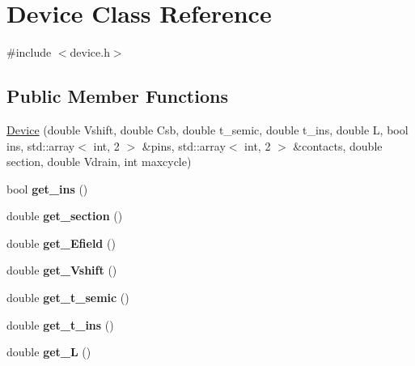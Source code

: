 \hypertarget{classDevice}{\section{Device Class Reference}
\label{classDevice}
}


{\ttfamily \#include $<$device.\-h$>$}

\subsection*{Public Member Functions}
\begin{DoxyCompactItemize}
\item 
\hyperlink{classDevice_a7c9bc563a5b6aaeddd44dab80d3c8121}{Device} (double Vshift, double Csb, double t\-\_\-semic, double t\-\_\-ins, double L, bool ins, std\-::array$<$ int, 2 $>$ \&pins, std\-::array$<$ int, 2 $>$ \&contacts, double section, double Vdrain, int maxcycle)
\item 
\hypertarget{classDevice_ab90a7fb2c749ccf25033da330590c2de}{bool {\bfseries get\-\_\-ins} ()}\label{classDevice_ab90a7fb2c749ccf25033da330590c2de}

\item 
\hypertarget{classDevice_a1c84a935099b1fa38983f7cfc9fa3fe8}{double {\bfseries get\-\_\-section} ()}\label{classDevice_a1c84a935099b1fa38983f7cfc9fa3fe8}

\item 
\hypertarget{classDevice_a2fabd548729fe1f66bc6578426b47732}{double {\bfseries get\-\_\-\-Efield} ()}\label{classDevice_a2fabd548729fe1f66bc6578426b47732}

\item 
\hypertarget{classDevice_a0e44635364c35d29b7bd1d04ae1b6e5b}{double {\bfseries get\-\_\-\-Vshift} ()}\label{classDevice_a0e44635364c35d29b7bd1d04ae1b6e5b}

\item 
\hypertarget{classDevice_a6160be09fdf4f0e97b4bddf6f862fc7d}{double {\bfseries get\-\_\-t\-\_\-semic} ()}\label{classDevice_a6160be09fdf4f0e97b4bddf6f862fc7d}

\item 
\hypertarget{classDevice_a3ee9e52ce69c2d267825466bb198f06f}{double {\bfseries get\-\_\-t\-\_\-ins} ()}\label{classDevice_a3ee9e52ce69c2d267825466bb198f06f}

\item 
\hypertarget{classDevice_a442fd74e8d72f3a34d6828d16a7da06d}{double {\bfseries get\-\_\-\-L} ()}\label{classDevice_a442fd74e8d72f3a34d6828d16a7da06d}


\end{DoxyCompactItemize}
